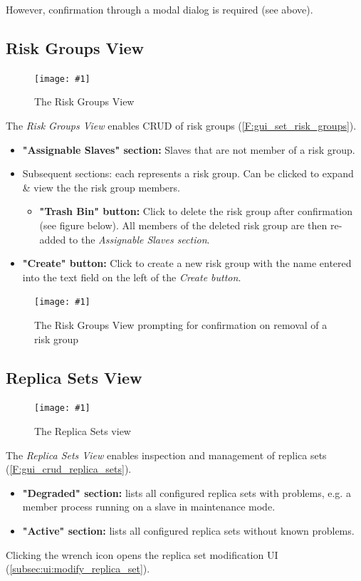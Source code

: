 \documentclass[a4paper, 11pt]{article}
\newcommand{\mamidscreenshot}[1]{\texttt{[image: \#1]}}
\newcommand{\uiel}[3]{\item \textbf{"#1" #2:} #3}
\begin{document}
However, confirmation through a modal dialog is required (see above).

\subsection{Risk Groups View}\label{subsec:ui:risk_groups_crud}
\begin{figure}[H]
	\centering
	\mamidscreenshot{screenshots/risk_groups}
	\caption{The Risk Groups View}
\end{figure}
The \textit{Risk Groups View} enables CRUD of \glspl{risk group} (\ref{F:gui_set_risk_groups}).
\begin{itemize}
	\uiel{Assignable Slaves}{section}{Slaves that are not member of a risk group.}
	\item Subsequent sections: each represents a risk group. Can be clicked to expand \& view the the risk group members.
	\begin{itemize}
		\uiel{Trash Bin}{button}{Click to delete the risk group after confirmation (see figure below). All members of the deleted risk group are then re-added to the \textit{Assignable Slaves section}.}
	\end{itemize}
	\uiel{Create}{button}{Click to create a new risk group with the name entered into the text field on the left of the \textit{Create button}.}
\end{itemize}
\begin{figure}[H]
	\centering
	\mamidscreenshot{screenshots/risk_groups_remove_confirmation}
	\caption{The Risk Groups View prompting for confirmation on removal of a risk group}
	\label{subsec:ui:risk_groups_removal_confirmation}
\end{figure}

\subsection{Replica Sets View}\label{subsec:ui:replica_sets_view}
\begin{figure}[H]
	\centering
	\mamidscreenshot{screenshots/replica_sets}
	\caption{The Replica Sets view}
\end{figure}
The \textit{Replica Sets View} enables inspection and management of replica sets (\ref{F:gui_crud_replica_sets}).
\begin{itemize}
	\uiel{Degraded}{section}{lists all configured replica sets with problems, e.g. a member process running on a \gls{slave} in \gls{maintenance mode}}.
	\uiel{Active}{section}{lists all configured replica sets without known problems}.
\end{itemize}
Clicking the wrench icon opens the replica set modification UI (\ref{subsec:ui:modify_replica_set}).
\end{document}
